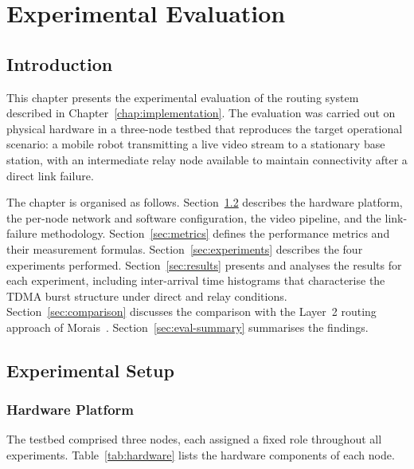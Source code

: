 
\chapter{Experimental Evaluation}
\label{chap:evaluation}

\section{Introduction}

This chapter presents the experimental evaluation of the routing system
described in Chapter~\ref{chap:implementation}. The evaluation was carried
out on physical hardware in a three-node testbed that reproduces the target
operational scenario: a mobile robot transmitting a live video stream to a
stationary base station, with an intermediate relay node available to
maintain connectivity after a direct link failure.

The chapter is organised as follows. Section~\ref{sec:setup} describes the
hardware platform, the per-node network and software configuration, the video
pipeline, and the link-failure methodology. Section~\ref{sec:metrics} defines
the performance metrics and their measurement formulas.
Section~\ref{sec:experiments} describes the four experiments performed.
Section~\ref{sec:results} presents and analyses the results for each
experiment, including inter-arrival time histograms that characterise the
TDMA burst structure under direct and relay conditions.
Section~\ref{sec:comparison} discusses the comparison with the Layer~2
routing approach of Morais~\cite{morais2024synchronization}.
Section~\ref{sec:eval-summary} summarises the findings.


\section{Experimental Setup}
\label{sec:setup}

\subsection{Hardware Platform}
\label{subsec:hardware}

The testbed comprised three nodes, each assigned a fixed role throughout
all experiments. Table~\ref{tab:hardware} lists the hardware components of
each node.

